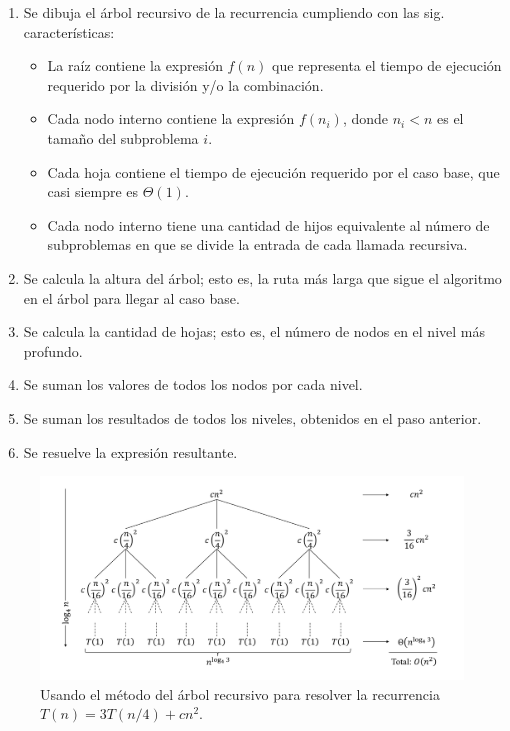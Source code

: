 \begin{enumerate}
  \item Se dibuja el árbol recursivo de la recurrencia cumpliendo con las sig. características:
  \begin{itemize}
    \item La raíz contiene la expresión \(f(n)\) que representa el tiempo de ejecución requerido por la división y/o la combinación.
    \item Cada nodo interno contiene la expresión \(f(n_i)\), donde \(n_i<n\) es el tamaño del subproblema \(i\).
    \item Cada hoja contiene el tiempo de ejecución requerido por el caso base, que casi siempre es \(\Theta(1)\).
    \item Cada nodo interno tiene una cantidad de hijos equivalente al número de subproblemas en que se divide la entrada de cada llamada recursiva.
  \end{itemize}
  \item Se calcula la altura del árbol; esto es, la ruta más larga que sigue el algoritmo en el árbol para llegar al caso base.
  \item Se calcula la cantidad de hojas; esto es, el número de nodos en el nivel más profundo.
  \item Se suman los valores de todos los nodos por cada nivel.
  \item Se suman los resultados de todos los niveles, obtenidos en el paso anterior.
  \item Se resuelve la expresión resultante. %
\end{enumerate}

\begin{figure}[t]
  \includegraphics[width=1\textwidth]{figuras/recursion-tree.png}
  \caption{Usando el método del árbol recursivo para resolver la recurrencia \(T(n)=3T(n/4)+cn^{2}\).}
  \label{fig:recursion_tree}
\end{figure}

